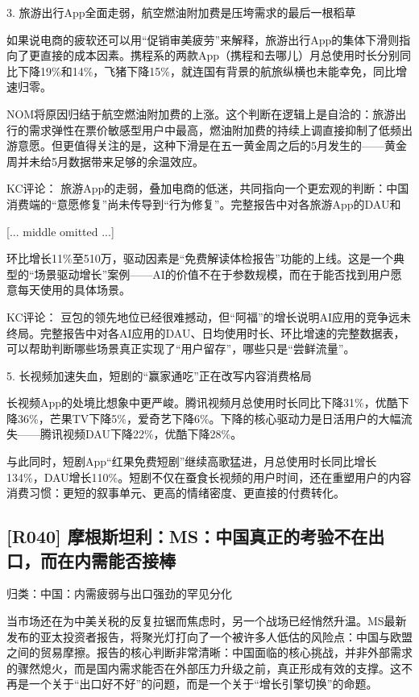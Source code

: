 \documentclass[11pt]{ctexart}
\begin{document}
3. 旅游出行App全面走弱，航空燃油附加费是压垮需求的最后一根稻草

如果说电商的疲软还可以用“促销审美疲劳”来解释，旅游出行App的集体下滑则指向了更直接的成本因素。携程系的两款App（携程和去哪儿）月总使用时长分别同比下降19\%和14\%，飞猪下降15\%，就连国有背景的航旅纵横也未能幸免，同比增速归零。

NOM将原因归结于航空燃油附加费的上涨。这个判断在逻辑上是自洽的：旅游出行的需求弹性在票价敏感型用户中最高，燃油附加费的持续上调直接抑制了低频出游意愿。但更值得关注的是，这种下滑是在五一黄金周之后的5月发生的——黄金周并未给5月数据带来足够的余温效应。

KC评论： 旅游App的走弱，叠加电商的低迷，共同指向一个更宏观的判断：中国消费端的“意愿修复”尚未传导到“行为修复”。完整报告中对各旅游App的DAU和

[... middle omitted ...]

环比增长11\%至510万，驱动因素是“免费解读体检报告”功能的上线。这是一个典型的“场景驱动增长”案例——AI的价值不在于参数规模，而在于能否找到用户愿意每天使用的具体场景。

KC评论： 豆包的领先地位已经很难撼动，但“阿福”的增长说明AI应用的竞争远未终局。完整报告中对各AI应用的DAU、日均使用时长、环比增速的完整数据表，可以帮助判断哪些场景真正实现了“用户留存”，哪些只是“尝鲜流量”。

5. 长视频加速失血，短剧的“赢家通吃”正在改写内容消费格局

长视频App的处境比想象中更严峻。腾讯视频月总使用时长同比下降31\%，优酷下降36\%，芒果TV下降5\%，爱奇艺下降6\%。下降的核心驱动力是日活用户的大幅流失——腾讯视频DAU下降22\%，优酷下降28\%。

与此同时，短剧App“红果免费短剧”继续高歌猛进，月总使用时长同比增长134\%，DAU增长110\%。短剧不仅在蚕食长视频的用户时间，还在重塑用户的内容消费习惯：更短的叙事单元、更高的情绪密度、更直接的付费转化。

\subsection{[R040] 摩根斯坦利：MS：中国真正的考验不在出口，而在内需能否接棒}
{\small\color{refgray}归类：中国：内需疲弱与出口强劲的罕见分化}

当市场还在为中美关税的反复拉锯而焦虑时，另一个战场已经悄然升温。MS最新发布的亚太投资者报告，将聚光灯打向了一个被许多人低估的风险点：中国与欧盟之间的贸易摩擦。报告的核心判断非常清晰：中国面临的核心挑战，并非外部需求的骤然熄火，而是国内需求能否在外部压力升级之前，真正形成有效的支撑。这不再是一个关于“出口好不好”的问题，而是一个关于“增长引擎切换”的命题。
\end{document}
